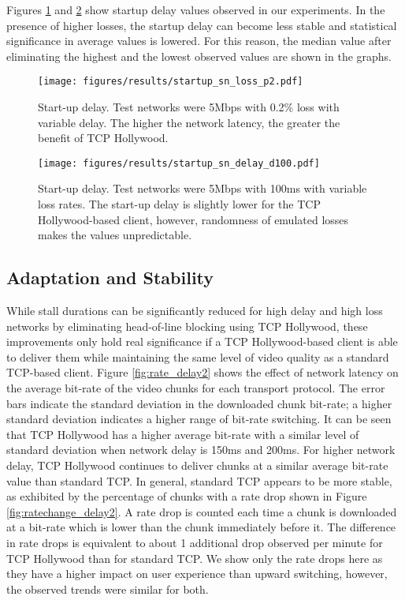 Figures \ref{fig:startup_delay2} and \ref{fig:startup_loss} show startup delay values
observed in our experiments. In the presence of higher losses, the startup delay can
become less stable and statistical significance in average values is lowered. For this
reason, the median value after eliminating the highest and the lowest observed values are
shown in the graphs.

\begin{figure}
  \centering
  \texttt{[image: figures/results/startup\_sn\_loss\_p2.pdf]}
  \caption{Start-up delay. Test networks were 5Mbps with 0.2\% loss with variable delay. 
           The higher the network latency, the greater the benefit of TCP Hollywood. }
  \label{fig:startup_delay2}
\end{figure}


\begin{figure}
  \centering
  \texttt{[image: figures/results/startup\_sn\_delay\_d100.pdf]}
  \caption{Start-up delay. Test networks were 5Mbps with 100ms with variable loss rates.  
           The start-up delay is slightly lower for the TCP Hollywood-based client, however, randomness of 
           emulated losses makes the values unpredictable. }
  \label{fig:startup_loss}
\end{figure}

\subsection{Adaptation and Stability}
While stall durations can be significantly reduced for high delay and high loss networks
by eliminating head-of-line blocking using TCP Hollywood, these improvements only hold
real significance if a TCP Hollywood-based client is able to deliver them while maintaining
the same level of video quality as a standard TCP-based client. Figure \ref{fig:rate_delay2} 
shows the effect of network latency on the average bit-rate of the video chunks for each transport
protocol. The error bars indicate the standard deviation in the downloaded chunk bit-rate; a higher standard deviation indicates a higher range of bit-rate switching. It can be seen that TCP Hollywood has a higher average bit-rate with a similar
level of standard deviation when network delay is 150ms and 200ms. For higher network
delay, TCP Hollywood continues to deliver chunks at a similar average bit-rate value than
standard TCP. In general, standard TCP appears to be more stable, as exhibited by the
percentage of chunks with a rate drop shown in Figure \ref{fig:ratechange_delay2}. A rate
drop is counted each time a chunk is downloaded at a bit-rate which is lower than the chunk
immediately before it. The difference in rate drops is equivalent to about 1 additional
drop observed per minute for TCP Hollywood than for standard TCP. We show only the rate drops here as they have a higher impact on user experience than upward switching, however, the observed trends were similar for both. 

